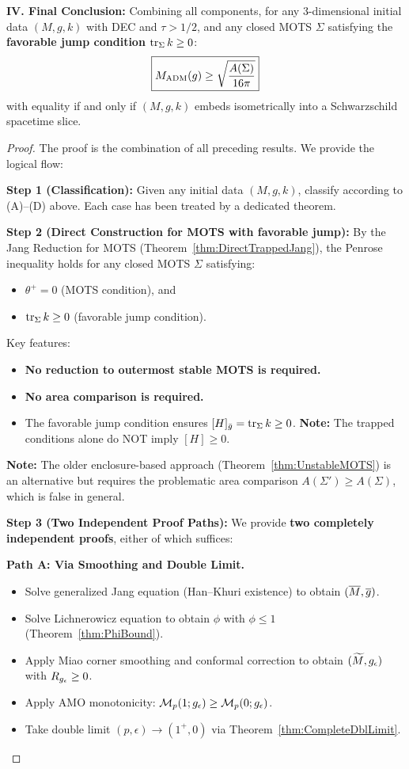\begin{theorem}
\textbf{IV. Final Conclusion:}
Combining all components, for any 3-dimensional initial data $(M, g, k)$ with DEC and $\tau > 1/2$, and any closed MOTS $\Sigma$ satisfying the \textbf{favorable jump condition} $\operatorname{tr}_\Sigma k \ge 0$:
\begin{equation}
    \boxed{M_{\mathrm{ADM}}(g) \ge \sqrt{\frac{A(\Sigma)}{16\pi}}}
\end{equation}
with equality if and only if $(M, g, k)$ embeds isometrically into a Schwarzschild spacetime slice.
\end{theorem}

\begin{proof}
The proof is the combination of all preceding results. We provide the logical flow:

\textbf{Step 1 (Classification):} Given any initial data $(M, g, k)$, classify according to (A)--(D) above. Each case has been treated by a dedicated theorem.

\textbf{Step 2 (Direct Construction for MOTS with favorable jump):}
By the Jang Reduction for MOTS (Theorem~\ref{thm:DirectTrappedJang}), the Penrose inequality holds for any closed MOTS $\Sigma$ satisfying:
\begin{itemize}
    \item $\theta^+ = 0$ (MOTS condition), and
    \item $\operatorname{tr}_\Sigma k \ge 0$ (favorable jump condition).
\end{itemize}
Key features:
\begin{itemize}
    \item \textbf{No reduction to outermost stable MOTS is required.}
    \item \textbf{No area comparison is required.}
    \item The favorable jump condition ensures $[H]_{\bar{g}} = \operatorname{tr}_\Sigma k \ge 0$. \textbf{Note:} The trapped conditions alone do NOT imply $[H] \ge 0$.
\end{itemize}
\textbf{Note:} The older enclosure-based approach (Theorem~\ref{thm:UnstableMOTS}) is an alternative but requires the problematic area comparison $A(\Sigma') \ge A(\Sigma)$, which is false in general.

\textbf{Step 3 (Two Independent Proof Paths):}
We provide \textbf{two completely independent proofs}, either of which suffices:

\textbf{Path A: Via Smoothing and Double Limit.}
\begin{itemize}
    \item Solve generalized Jang equation (Han--Khuri existence) to obtain $(\overline{M}, \overline{g})$.
    \item Solve Lichnerowicz equation to obtain $\phi$ with $\phi \le 1$ (Theorem~\ref{thm:PhiBound}).
    \item Apply Miao corner smoothing and conformal correction to obtain $(\widetilde{M}, g_{\epsilon})$ with $R_{g_{\epsilon}} \ge 0$.
    \item Apply AMO monotonicity: $\mathcal{M}_p(1; g_{\epsilon}) \ge \mathcal{M}_p(0; g_{\epsilon})$.
    \item Take double limit $(p, \epsilon) \to (1^+, 0)$ via Theorem~\ref{thm:CompleteDblLimit}.
\end{itemize}


\end{proof}
